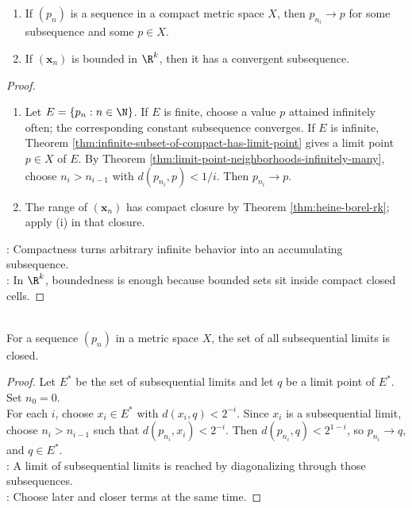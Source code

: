 \begin{theorem} \label{thm:compact-sequential-subsequence} 
\begin{enumerate}[label=(\roman*)]
\setlength{\itemsep}{0pt}
\item If $(p_n)$ is a sequence in a compact metric space $X$, then $p_{n_i}\to p$ for some subsequence and some $p\in X$.
\item If $(\mathbf{x}_n)$ is bounded in $\R^k$, then it has a convergent subsequence.
\end{enumerate}
\begin{proof}
\begin{enumerate}[label=(\roman*)]
\setlength{\itemsep}{0pt}
\item Let $E=\{p_n:n\in\N\}$. If $E$ is finite, choose a value $p$ attained infinitely often; the corresponding constant subsequence converges. If $E$ is infinite, Theorem \ref{thm:infinite-subset-of-compact-has-limit-point} gives a limit point $p\in X$ of $E$. By Theorem \ref{thm:limit-point-neighborhoods-infinitely-many}, choose $n_i>n_{i-1}$ with $d(p_{n_i},p)<1/i$. Then $p_{n_i}\to p$.
\item The range of $(\mathbf{x}_n)$ has compact closure by Theorem \ref{thm:heine-borel-rk}; apply (i) in that closure.
\end{enumerate}
: Compactness turns arbitrary infinite behavior into an accumulating subsequence.\\
: In $\R^k$, boundedness is enough because bounded sets sit inside compact closed cells.
\end{proof}
\end{theorem}

\begin{theorem} \label{thm:subsequential-limits-closed} \\
For a sequence $(p_n)$ in a metric space $X$, the set of all subsequential limits is closed.
\begin{proof}
Let $E^*$ be the set of subsequential limits and let $q$ be a limit point of $E^*$. Set $n_0=0$.\\
For each $i$, choose $x_i\in E^*$ with $d(x_i,q)<2^{-i}$. Since $x_i$ is a subsequential limit, choose $n_i>n_{i-1}$ such that $d(p_{n_i},x_i)<2^{-i}$. Then $d(p_{n_i},q)<2^{1-i}$, so $p_{n_i}\to q$, and $q\in E^*$.\\
: A limit of subsequential limits is reached by diagonalizing through those subsequences.\\
: Choose later and closer terms at the same time.
\end{proof}
\end{theorem}

